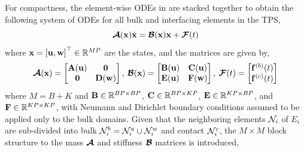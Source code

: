 For compactness, the element-wise ODEs in  are stacked together to obtain the following system of ODEs for all bulk and interfacing elements in the TPS,
\begin{equation}
    \boldsymbol{\mathcal{A}}(\mathbf{x})\dot{\mathbf{x}} = \boldsymbol{\mathcal{B}}(\mathbf{x})\mathbf{x} + \boldsymbol{\mathcal{F}}(t)\label{eqn_compact_dg_fem}
\end{equation}
where $\mathbf{x} = \left[\mathbf{u},\mathbf{w}\right]^\top\in\mathbb{R}^{MP}$ are the states, and the matrices are given by,
\begin{equation}
    \boldsymbol{\mathcal{A}}(\mathbf{x}) = \begin{bmatrix}
            \mathbf{A}(\mathbf{u}) & \mathbf{0}\\
            \mathbf{0} & \mathbf{D}(\mathbf{w})
        \end{bmatrix},\: \boldsymbol{\mathcal{B}}(\mathbf{x}) = \begin{bmatrix}
            \mathbf{B}(\mathbf{u}) & \mathbf{C}(\mathbf{u}) \\ 
            \mathbf{E}(\mathbf{u}) & \mathbf{F}(\mathbf{w})
        \end{bmatrix},\: \boldsymbol{\mathcal{F}}(t) = \begin{bmatrix}
            \mathbf{f}^{(b)}(t) \\ 
            \mathbf{f}^{(c)}(t)
        \end{bmatrix}
\end{equation}
where $M=B+K$ and $\mathbf{B}\in\mathbb{R}^{BP\times BP}$, $\mathbf{C}\in\mathbb{R}^{BP\times KP}$, $\mathbf{E}\in\mathbb{R}^{KP\times BP}$, and $\mathbf{F}\in\mathbb{R}^{KP\times KP}$, with Neumann and Dirichlet boundary conditions assumed to be applied only to the bulk domains. Given that the neighboring elements $\mathcal{N}_i$ of $E_i$ are sub-divided into bulk $\mathcal{N}_i^b=\mathcal{N}_i^u\cup\mathcal{N}_i^w$ and contact $\mathcal{N}_i^c$, the $M\times M$ block structure to the mass $\boldsymbol{\mathcal{A}}$ and stiffness $\boldsymbol{\mathcal{B}}$ matrices is introduced,
